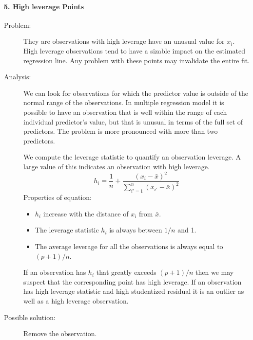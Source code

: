\documentclass[a4paper]{article}
\begin{document}
						\paragraph{5. High leverage Points}
						\begin{description}
							\item[Problem:]	They are observations with high leverage have an unusual value for $x_i$. High leverage observations tend to have a sizable impact on the estimated regression line. Any problem with these points may invalidate the entire fit.
							
							\item[Analysis:] We can look for observations for which the predictor value is outside of the normal range of the observations.
							In multiple regression model it is possible to have an observation that is well within the range of each individual predictor's value, but that is unusual in terms of the full set of predictors. The problem is more pronounced with more than two predictors.
							
							We compute the leverage statistic to quantify an observation leverage. A large value of this indicates an observation with high leverage.
							\begin{equation}
								h_i = \frac{1}{n} + \frac{(x_i - \bar{x})^2}{\sum_{i'=1}^n (x_{i'} - \bar{x})^2}
							\end{equation}
							Properties of equation:
							\begin{itemize}
								\item $h_i$ increase with the distance of $x_i$ from $\bar{x}$.
								\item The leverage statistic $h_i$ is always between $1/n$ and 1.
								\item The average leverage for all the observations is always equal to $(p + 1)/n$.
							\end{itemize}
							If an observation has $h_i$ that greatly exceeds $(p + 1)/n$ then we may suspect that the corresponding point has high leverage.
							If an observation has high leverage statistic and high studentized residual it is an outlier as well as a high leverage observation.
							
							\item[Possible solution:] Remove the observation.			
						
						\end{description}
							
							
\end{document}
